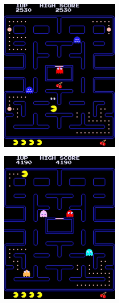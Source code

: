 \documentclass[12pt,a4paper]{report}
\begin{document}
\begin{figure}[hb!]
\begin{subfigure}{.32\textwidth}
  \includegraphics[width=.95\linewidth]{snapshot2}
  \caption{}
  \label{fig:snap2}
\end{subfigure}%
\begin{subfigure}{.32\textwidth}
  \centering
  \includegraphics[width=.95\linewidth]{snapshot3}

\end{subfigure}
\end{figure}
\end{document}
